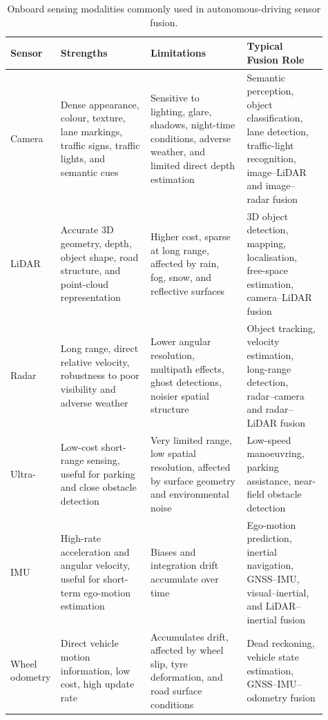 \documentclass[graybox,envcountchap]{style/SNmono}
\providecommand{\DIFadd}[1]{{\protect\color{blue} #1}} %
\providecommand{\DIFdel}[1]{{\protect\color{red} #1}} %
\providecommand{\DIFaddFL}[1]{\DIFadd{#1}} %
\providecommand{\DIFdelFL}[1]{\DIFdel{#1}} %
\providecommand{\DIFaddbeginFL}{} %
\providecommand{\DIFaddendFL}{} %
\providecommand{\DIFdelbeginFL}{} %
\providecommand{\DIFdelendFL}{} %
\begin{document}
\begin{table}[!t]
    \centering
    \renewcommand{\arraystretch}{1.25}
    \small
    \caption{Onboard sensing modalities commonly used in autonomous-driving sensor fusion.}
    \label{tab:av-onboard-sensors}
    \begin{tabular}{p{0.08\linewidth} p{0.28\linewidth} p{0.30\linewidth} p{0.25\linewidth}}
        \hline
        \textbf{Sensor} & \textbf{Strengths} & \textbf{Limitations} & \textbf{Typical Fusion Role} \\
        \hline
        Camera & Dense appearance, colour, texture, lane markings, traffic signs, traffic lights, and semantic cues & Sensitive to lighting, glare, shadows, night-time conditions, adverse weather, and limited direct depth estimation & Semantic perception, object classification, lane detection, traffic-light recognition, image--LiDAR and image--radar fusion \\
        \hline
        LiDAR & Accurate 3D geometry, depth, object shape, road structure, and point-cloud representation & Higher cost, sparse at long range, affected by rain, fog, snow, and reflective surfaces & 3D object detection, mapping, localisation, free-space estimation, camera--LiDAR fusion \\
        \hline
        Radar & Long range, direct relative velocity, robustness to poor visibility and adverse weather & Lower angular resolution, multipath effects, ghost detections, noisier spatial structure & Object tracking, velocity estimation, long-range detection, radar--camera and radar--LiDAR fusion \\
        \hline
        \DIFdelbeginFL \DIFdelFL{Ultra-}\allowbreak\DIFdelFL{sonic }\DIFdelendFL \DIFaddbeginFL \DIFaddFL{Ultra-}\allowbreak \DIFaddFL{sonic }\DIFaddendFL & Low-cost short-range sensing, useful for parking and close obstacle detection & Very limited range, low spatial resolution, affected by surface geometry and environmental noise & Low-speed manoeuvring, parking assistance, near-field obstacle detection \\
        \hline
        IMU & High-rate acceleration and angular velocity, useful for short-term ego-motion estimation & Biases and integration drift accumulate over time & Ego-motion prediction, inertial navigation, GNSS--IMU, visual--inertial, and LiDAR--inertial fusion \\
        \hline
        Wheel odometry & Direct vehicle motion information, low cost, high update rate & Accumulates drift, affected by wheel slip, tyre deformation, and road surface conditions & Dead reckoning, vehicle state estimation, GNSS--IMU--odometry fusion \\
        \hline
    \end{tabular}
\end{table}
\end{document}
